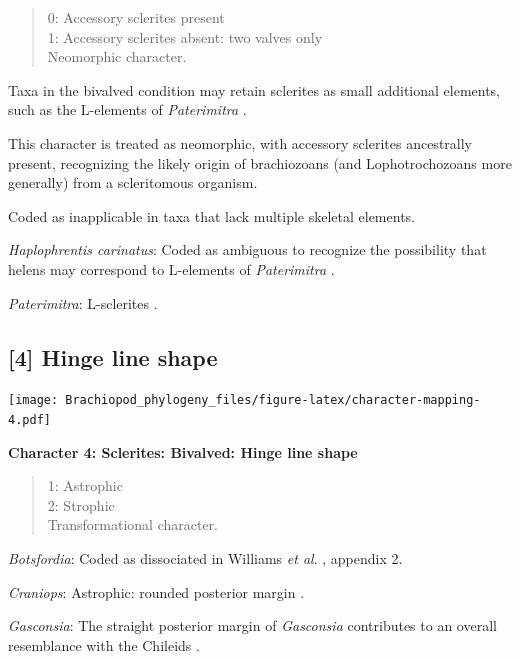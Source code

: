 \documentclass[openany]{book}
\theoremstyle{definition}
\theoremstyle{definition}
\theoremstyle{definition}
\theoremstyle{remark}
\begin{document}
\begin{quote}
0: Accessory sclerites present\\
1: Accessory sclerites absent: two valves only\\
Neomorphic character.
\end{quote}

Taxa in the bivalved condition may retain sclerites as small additional
elements, such as the L-elements of \emph{Paterimitra}
\citep{Skovsted2015Theearly}.

This character is treated as neomorphic, with accessory sclerites
ancestrally present, recognizing the likely origin of brachiozoans (and
Lophotrochozoans more generally) from a scleritomous organism.

Coded as inapplicable in taxa that lack multiple skeletal elements.

\hypertarget{Haplophrentis_carinatus-coding-3}{}
\emph{Haplophrentis carinatus}: Coded as ambiguous to recognize the
possibility that helens may correspond to L-elements of
\emph{Paterimitra} \citep{Moysiuk2017Hyolithsare}.

\hypertarget{Paterimitra-coding-3}{}
\emph{Paterimitra}: L-sclerites \citep{Skovsted2009Thescleritome}.

\subsection*{{[}4{]} Hinge line shape}\label{hinge-line-shape}

\texttt{[image: Brachiopod\_phylogeny\_files/figure-latex/character-mapping-4.pdf]}

\textbf{Character 4: Sclerites: Bivalved: Hinge line shape}

\begin{quote}
1: Astrophic\\
2: Strophic\\
Transformational character.
\end{quote}

\hypertarget{Botsfordia-coding-4}{}
\emph{Botsfordia}: Coded as dissociated in Williams \emph{et al}.
\citeyearpar{Williams1998Thediversity}, appendix 2.

\hypertarget{Craniops-coding-4}{}
\emph{Craniops}: Astrophic: rounded posterior margin \citep[see fig. 91
in][]{Williams2000LinguliformeaCraniiformea}.

\hypertarget{Gasconsia-coding-4}{}
\emph{Gasconsia}: The straight posterior margin of \emph{Gasconsia}
contributes to an overall resemblance with the Chileids
\citep{Holmer2014Ordovician96}.
\end{document}
